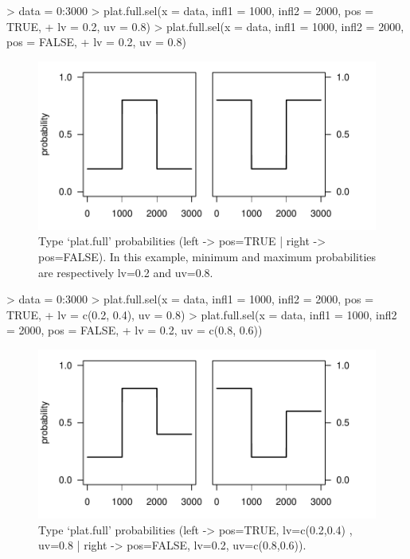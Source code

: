 \documentclass[letterpaper, 12pt]{article}
\begin{document}
\begin{Schunk}
\begin{Sinput}
> data = 0:3000
> plat.full.sel(x = data, infl1 = 1000, infl2 = 2000, pos = TRUE, 
+     lv = 0.2, uv = 0.8)
> plat.full.sel(x = data, infl1 = 1000, infl2 = 2000, pos = FALSE, 
+     lv = 0.2, uv = 0.8)
\end{Sinput}
\end{Schunk}
\begin{figure}[h]
\vspace{-20pt}
\begin{center}
\includegraphics{relation_sel-011}
\end{center}
\vspace{-30pt}
\caption{Type `plat.full' probabilities (left -> pos=TRUE |  right -> pos=FALSE). In this example, minimum and maximum probabilities are respectively lv=0.2 and uv=0.8.}
\vspace{-10pt}
\label{fig5}
\end{figure}

\begin{Schunk}
\begin{Sinput}
> data = 0:3000
> plat.full.sel(x = data, infl1 = 1000, infl2 = 2000, pos = TRUE, 
+     lv = c(0.2, 0.4), uv = 0.8)
> plat.full.sel(x = data, infl1 = 1000, infl2 = 2000, pos = FALSE, 
+     lv = 0.2, uv = c(0.8, 0.6))
\end{Sinput}
\end{Schunk}
\begin{figure}[h]
\vspace{-20pt}
\begin{center}
\includegraphics{relation_sel-013}
\end{center}
\vspace{-30pt}
\caption{Type `plat.full' probabilities (left -> pos=TRUE, lv=c(0.2,0.4) , uv=0.8 | right -> pos=FALSE, lv=0.2, uv=c(0.8,0.6)).}
\vspace{-10pt}
\label{fig6}
\end{figure}
\end{document}
